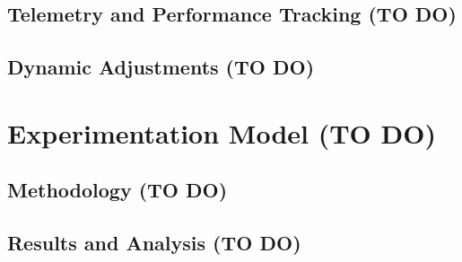 
\subsection{Telemetry and Performance Tracking (TO DO)}


\subsection{Dynamic Adjustments (TO DO)}


\section{Experimentation Model (TO DO)}


\subsection{Methodology (TO DO)}


\subsection{Results and Analysis (TO DO)}

